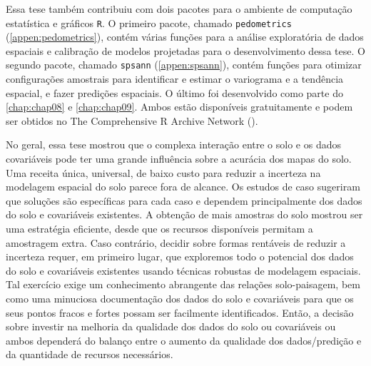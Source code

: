 Essa tese também contribuiu com dois pacotes para o ambiente de computação estatística e gráficos \texttt{R}. 
O primeiro pacote, chamado \texttt{pedometrics} (\autoref{appen:pedometrics}), contém várias funções para a 
análise exploratória de dados espaciais e calibração de modelos projetadas para o desenvolvimento dessa tese. 
O segundo pacote, chamado \texttt{spsann} (\autoref{appen:spsann}), contém funções para otimizar configurações 
amostrais para identificar e estimar o variograma e a tendência espacial, e fazer predições espaciais. O 
último foi desenvolvido como parte do \autoref{chap:chap08} e \autoref{chap:chap09}. Ambos estão disponíveis 
gratuitamente e podem ser obtidos no The Comprehensive R Archive Network (\cran).

No geral, essa tese mostrou que o complexa interação entre o solo e os dados covariáveis pode ter uma grande 
influência sobre a acurácia dos mapas do solo. Uma receita única, universal, de baixo custo para reduzir a 
incerteza na modelagem espacial do solo parece fora de alcance. Os estudos de caso sugeriram que soluções são 
específicas para cada caso e dependem principalmente dos dados do solo e covariáveis existentes. A obtenção de
mais amostras do solo mostrou ser uma estratégia eficiente, desde que os recursos disponíveis permitam a 
amostragem extra. Caso contrário, decidir sobre formas rentáveis de reduzir a incerteza requer, em primeiro 
lugar, que exploremos todo o potencial dos dados do solo e covariáveis existentes usando técnicas robustas de 
modelagem espaciais. Tal exercício exige um conhecimento abrangente das relações solo-paisagem, bem como uma 
minuciosa documentação dos dados do solo e covariáveis para que os seus pontos fracos e fortes possam ser 
facilmente identificados. Então, a decisão sobre investir na melhoria da qualidade dos dados do solo ou 
covariáveis ou ambos dependerá do balanço entre o aumento da qualidade dos dados/predição e da quantidade de 
recursos necessários.
